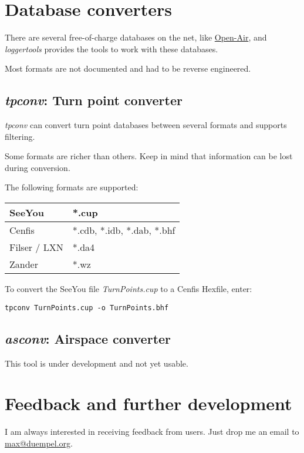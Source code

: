 \documentclass{article}
\begin{document}
\section{Database converters}

There are several free-of-charge databases on the net, like
\href{http://www.segelflug.de/segelflieger/michael.meier/}{Open-Air},
and {\em loggertools} provides the tools to work with these databases.

Most formats are not documented and had to be reverse engineered.


\subsection{{\em tpconv}: Turn point converter}

{\em tpconv} can convert turn point databases between several formats
and supports filtering.

Some formats are richer than others.  Keep in mind that information
can be lost during conversion.

The following formats are supported:

\begin{tabular}{|l|l|}
\hline
SeeYou & *.cup \\
\hline
Cenfis & *.cdb, *.idb, *.dab, *.bhf \\
\hline
Filser / LXN & *.da4 \\
\hline
Zander & *.wz \\
\hline
\end{tabular}

To convert the SeeYou file {\em TurnPoints.cup} to a Cenfis Hexfile,
enter:

\begin{verbatim}
tpconv TurnPoints.cup -o TurnPoints.bhf 
\end{verbatim}


\subsection{{\em asconv}: Airspace converter}

This tool is under development and not yet usable.


\section{Feedback and further development}

I am always interested in receiving feedback from users.  Just drop me
an email to \href{mailto:max@duempel.org}{max@duempel.org}.
\end{document}
